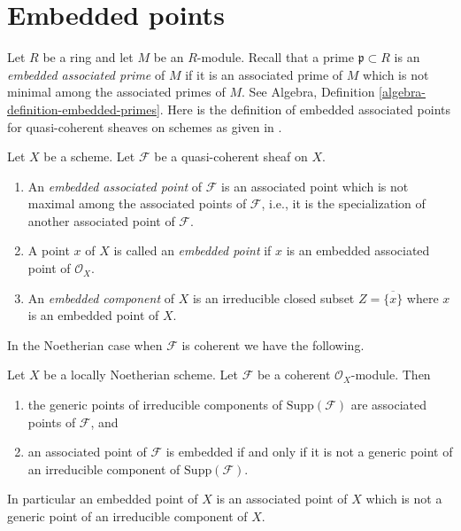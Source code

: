 \section{Embedded points}
\label{section-embedded}

\noindent
Let $R$ be a ring and let $M$ be an $R$-module.
Recall that a prime $\mathfrak p \subset R$ is an
{\it embedded associated prime} of $M$ if it is an associated prime of
$M$ which is not minimal among the associated primes of $M$. See
Algebra, Definition \ref{algebra-definition-embedded-primes}.
Here is the definition of embedded associated points
for quasi-coherent sheaves on schemes
as given in \cite[IV Definition 3.1.1]{EGA}.

\begin{definition}
\label{definition-embedded}
Let $X$ be a scheme.
Let $\mathcal{F}$ be a quasi-coherent sheaf on $X$.
\begin{enumerate}
\item An {\it embedded associated point} of $\mathcal{F}$
is an associated point which is not maximal among the
associated points of $\mathcal{F}$, i.e., it is the specialization
of another associated point of $\mathcal{F}$.
\item A point $x$ of $X$ is called an {\it embedded point}
if $x$ is an embedded associated point of $\mathcal{O}_X$.
\item An {\it embedded component} of $X$ is an irreducible
closed subset $Z = \overline{\{x\}}$ where $x$ is an embedded
point of $X$.
\end{enumerate}
\end{definition}

\noindent
In the Noetherian case when $\mathcal{F}$ is coherent we have
the following.

\begin{lemma}
\label{lemma-embedded}
Let $X$ be a locally Noetherian scheme.
Let $\mathcal{F}$ be a coherent $\mathcal{O}_X$-module.
Then
\begin{enumerate}
\item the generic points of irreducible components of
$\text{Supp}(\mathcal{F})$ are associated points of $\mathcal{F}$, and
\item an associated point of $\mathcal{F}$ is embedded if and only
if it is not a generic point of an irreducible component
of $\text{Supp}(\mathcal{F})$.
\end{enumerate}
In particular an embedded point of $X$ is an associated point of $X$
which is not a generic point of an irreducible component of $X$.
\end{lemma}

